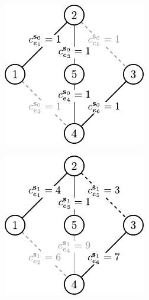 \begin{table}[!htbp]
{	}
	\label{tab:minmaxrobexample}
\end{table}

\begin{figure}[!htbp]
	\null\hfill
	\begin{subfigure}[b]{0.3\textwidth}
		\includegraphics[width=\textwidth]{Chapter_II/ROB-INC-MST-example/a1}
		\caption{}
		\label{fig:robincrexample:a}
	\end{subfigure}
	\hfill
	\begin{subfigure}[b]{0.3\textwidth}
		\includegraphics[width=\textwidth]{Chapter_II/ROB-INC-MST-example/b1}

\end{subfigure}
\end{figure}
